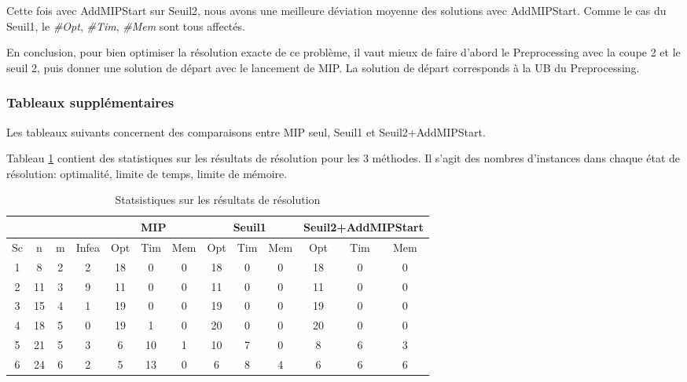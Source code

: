 Cette fois avec AddMIPStart sur Seuil2, nous avons une meilleure déviation moyenne des solutions avec AddMIPStart. Comme le cas du Seuil1, le \textit{\#Opt}, \textit{\#Tim}, \textit{\#Mem} sont tous affectés. 

En conclusion, pour bien optimiser la résolution exacte de ce problème, il vaut mieux de faire d'abord le Preprocessing avec la coupe 2 et le seuil 2, puis donner une solution de départ avec le lancement de MIP. La solution de départ corresponds à la UB du Preprocessing.

\clearpage
\subsubsection{Tableaux supplémentaires}
Les tableaux suivants concernent des comparaisons entre MIP seul, Seuil1 et Seuil2+AddMIPStart.

Tableau \ref{tab_mip_s1_ams2_stats} contient des statistiques sur les résultats de résolution pour les 3 méthodes. Il s'agit des nombres d'instances dans chaque état de résolution: optimalité, limite de temps, limite de mémoire. 
\begin{table}[h]
    \centering
\begin{tabular}{|c|c|c|c|c|c|c|c|c|c|c|c|c|} 
\hline
&&&&\multicolumn{3}{c|}{MIP} &\multicolumn{3}{c|}{Seuil1}&\multicolumn{3}{c|}{Seuil2+AddMIPStart}  \\ \hline
Sc&n&m & Infea & Opt	& Tim & Mem  & Opt	& Tim & Mem   & Opt	& Tim & Mem \\ \hline
1&  	8	&2	& 2 & 18 & 0 & 0 & 18	& 0	& 0&18	&0	&0\\ \hline
2& 	    11	&3	& 9 & 11 & 0 & 0 & 11	& 0	& 0&11	&0	&0\\ \hline
3&  	15	&4	& 1 & 19 & 0 & 0 & 19	& 0	& 0&19	&0	&0\\ \hline
4&		18	&5	& 0 & 19 & 1 & 0 & 20	&0	&0&	20	&0	&0\\ \hline
5&		21	&5	& 3 & 6 &  10 & 1 &10	&7	&0&	8	&6	&3\\ \hline
6&		24	&6	& 2 & 5 &  13 & 0 &6	&8	&4&	6	&6	&6\\ \hline  
\end{tabular}
\caption{Statsistiques sur les résultats de résolution}
    \label{tab_mip_s1_ams2_stats}
\end{table}
\bigskip

